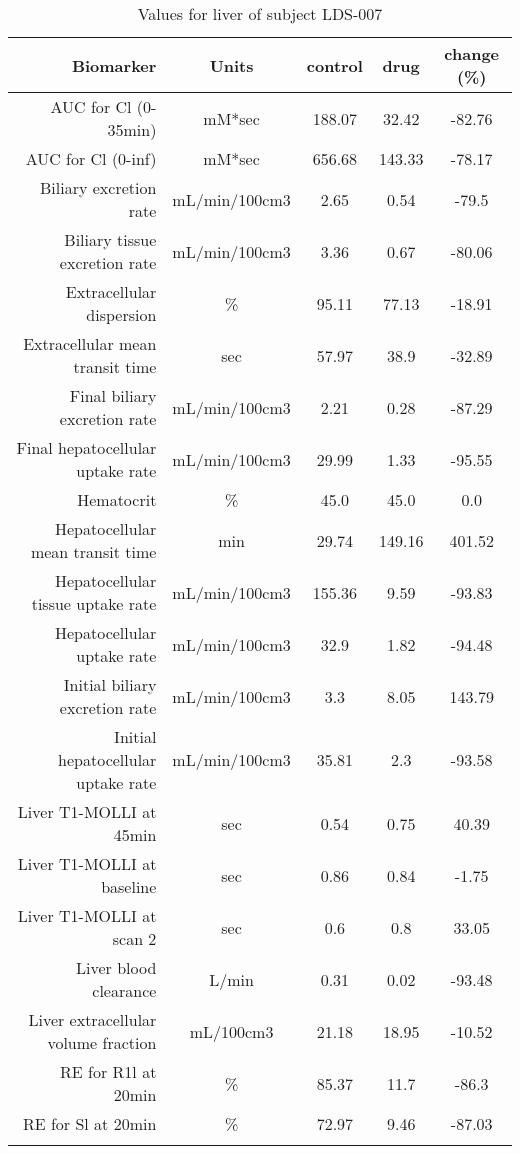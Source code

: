 \documentclass{epflreport}%
\begin{document}
%
\clearpage%
\begin{longtable}{rcccc}%
\hline%
Biomarker&Units&control&drug&change (\%)\\%
\hline%
AUC for Cl (0{-}35min)&mM*sec&188.07&32.42&{-}82.76\\%
AUC for Cl (0{-}inf)&mM*sec&656.68&143.33&{-}78.17\\%
Biliary excretion rate&mL/min/100cm3&2.65&0.54&{-}79.5\\%
Biliary tissue excretion rate&mL/min/100cm3&3.36&0.67&{-}80.06\\%
Extracellular dispersion&\%&95.11&77.13&{-}18.91\\%
Extracellular mean transit time&sec&57.97&38.9&{-}32.89\\%
Final biliary excretion rate&mL/min/100cm3&2.21&0.28&{-}87.29\\%
Final hepatocellular uptake rate&mL/min/100cm3&29.99&1.33&{-}95.55\\%
Hematocrit&\%&45.0&45.0&0.0\\%
Hepatocellular mean transit time&min&29.74&149.16&401.52\\%
Hepatocellular tissue uptake rate&mL/min/100cm3&155.36&9.59&{-}93.83\\%
Hepatocellular uptake rate&mL/min/100cm3&32.9&1.82&{-}94.48\\%
Initial biliary excretion rate&mL/min/100cm3&3.3&8.05&143.79\\%
Initial hepatocellular uptake rate&mL/min/100cm3&35.81&2.3&{-}93.58\\%
Liver T1{-}MOLLI at 45min&sec&0.54&0.75&40.39\\%
Liver T1{-}MOLLI at baseline&sec&0.86&0.84&{-}1.75\\%
Liver T1{-}MOLLI at scan 2&sec&0.6&0.8&33.05\\%
Liver blood clearance&L/min&0.31&0.02&{-}93.48\\%
Liver extracellular volume fraction&mL/100cm3&21.18&18.95&{-}10.52\\%
RE for R1l at 20min&\%&85.37&11.7&{-}86.3\\%
RE for Sl at 20min&\%&72.97&9.46&{-}87.03\\%
\hline%
\caption{Values for liver of subject LDS-007} \\%
\end{longtable}%
\end{document}
